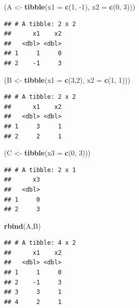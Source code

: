 \documentclass[
  11pt,
]{book}
\newenvironment{Shaded}{\begin{snugshade}}{\end{snugshade}}
\newcommand{\DataTypeTok}[1]{\textcolor[rgb]{0.13,0.29,0.53}{#1}}
\newcommand{\DecValTok}[1]{\textcolor[rgb]{0.00,0.00,0.81}{#1}}
\newcommand{\KeywordTok}[1]{\textcolor[rgb]{0.13,0.29,0.53}{\textbf{#1}}}
\newcommand{\NormalTok}[1]{#1}
\newcommand{\StringTok}[1]{\textcolor[rgb]{0.31,0.60,0.02}{#1}}
\numberwithin{equation}{section}
\numberwithin{countremarque}{section}
\begin{document}
\begin{Shaded}
\begin{Highlighting}[]
\NormalTok{(A \textless{}{-}}\StringTok{ }\KeywordTok{tibble}\NormalTok{(}\DataTypeTok{x1 =} \KeywordTok{c}\NormalTok{(}\DecValTok{1}\NormalTok{, }\DecValTok{{-}1}\NormalTok{), }\DataTypeTok{x2 =} \KeywordTok{c}\NormalTok{(}\DecValTok{0}\NormalTok{, }\DecValTok{3}\NormalTok{)))}
\end{Highlighting}
\end{Shaded}

\begin{lstlisting}
## # A tibble: 2 x 2
##      x1    x2
##   <dbl> <dbl>
## 1     1     0
## 2    -1     3
\end{lstlisting}

\begin{Shaded}
\begin{Highlighting}[]
\NormalTok{(B \textless{}{-}}\StringTok{ }\KeywordTok{tibble}\NormalTok{(}\DataTypeTok{x1 =} \KeywordTok{c}\NormalTok{(}\DecValTok{3}\NormalTok{,}\DecValTok{2}\NormalTok{), }\DataTypeTok{x2 =} \KeywordTok{c}\NormalTok{(}\DecValTok{1}\NormalTok{, }\DecValTok{1}\NormalTok{)))}
\end{Highlighting}
\end{Shaded}

\begin{lstlisting}
## # A tibble: 2 x 2
##      x1    x2
##   <dbl> <dbl>
## 1     3     1
## 2     2     1
\end{lstlisting}

\begin{Shaded}
\begin{Highlighting}[]
\NormalTok{(C \textless{}{-}}\StringTok{ }\KeywordTok{tibble}\NormalTok{(}\DataTypeTok{x3 =} \KeywordTok{c}\NormalTok{(}\DecValTok{0}\NormalTok{, }\DecValTok{3}\NormalTok{)))}
\end{Highlighting}
\end{Shaded}

\begin{lstlisting}
## # A tibble: 2 x 1
##      x3
##   <dbl>
## 1     0
## 2     3
\end{lstlisting}

\begin{Shaded}
\begin{Highlighting}[]
\KeywordTok{rbind}\NormalTok{(A,B)}
\end{Highlighting}
\end{Shaded}

\begin{lstlisting}
## # A tibble: 4 x 2
##      x1    x2
##   <dbl> <dbl>
## 1     1     0
## 2    -1     3
## 3     3     1
## 4     2     1
\end{lstlisting}
\end{document}
